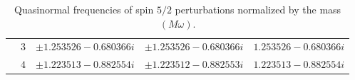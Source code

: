 \begin{table}[ht]
{\begin{tabular}{l |c|c|c|c}
          & $3$ & $\pm 1.253526-0.680366i$                  & $\pm 1.253526-0.680366i$                   & $1.253526 - 0.680366 i$        \\
          & $4$ & $\pm 1.223513-0.882554i$                  & $\pm 1.223512-0.882553i$                   & $1.223513 - 0.882554 i$        \\
      \hline\hline
    \end{tabular}%
  }
  \caption{
    Quasinormal frequencies of spin $5/2$ perturbations normalized by the mass $(M\omega)$.
  }
  \label{Tab:Spin5/2}
\end{table}


\begin{table}[t]
  \centering
  \caption{
    Purely imaginary frequencies for spin $1/2$ perturbations normalized by the mass $(M\omega)$. The numerical values of such frequencies are exactly the same as for the purely imaginary frequencies arising in the \ac{QNM} of spin $3/2$ perturbations.
  }
  \label{Tab:PurelyImSpin1/2}
\end{table}

